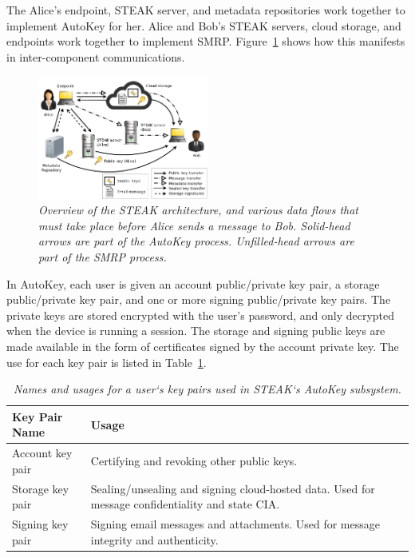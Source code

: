The Alice's endpoint, STEAK server, and metadata repositories work together to implement AutoKey for her.  Alice and Bob's STEAK servers, cloud storage, and endpoints work together to implement SMRP.  Figure~\ref{fig:overview} shows how this manifests in inter-component communications.

\begin{figure}[h!]
\centering
\includegraphics[width=0.5\textwidth]{figures/overview}
\caption{\it Overview of the STEAK architecture, and various data flows that must take place before Alice sends a message to Bob.  Solid-head arrows are part of the AutoKey process.  Unfilled-head arrows are part of the SMRP process.}
\label{fig:overview}
\end{figure}


In AutoKey, each user is given an account public/private key pair, a storage public/private key pair, and one or more signing public/private key pairs.  The private keys are stored encrypted with the user's password, and only decrypted when the device is running a session.  The storage and signing public keys are made available in the form of certificates signed by the account private key.  The use for each key pair is listed in Table~\ref{tab:keypairs}.

\begin{table}[ht!]
\begin{tabular}{ | l | p{14cm} |}
\hline
\textbf{Key Pair Name} & \textbf{Usage} \\
\hline
Account key pair & Certifying and revoking other public keys. \\
Storage key pair & Sealing/unsealing and signing cloud-hosted data.  Used for message confidentiality and state CIA. \\
Signing key pair & Signing email messages and attachments.  Used for message integrity and authenticity. \\
\hline
\end{tabular}
\caption{\it Names and usages for a user`s key pairs used in STEAK`s AutoKey subsystem.}
\label{tab:keypairs}
\end{table}



